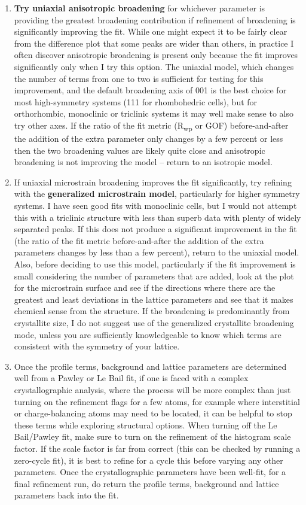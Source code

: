 \begin{enumerate}
 \item \textbf{Try uniaxial anisotropic broadening} for whichever parameter is providing the greatest broadening contribution if refinement of broadening is significantly improving the fit. While one might expect it to be fairly clear from the difference plot that some peaks are wider than others, in practice I often discover anisotropic broadening is present only because the fit improves significantly only when I try this option. The uniaxial model, which changes the number of terms from one to two is sufficient for testing for this improvement, and the default broadening axis of 001 is the best choice for most high-symmetry systems (111 for rhombohedric cells), but for orthorhombic, monoclinic or triclinic systems it may well make sense to also try other axes. If the ratio of the fit metric (R\textsubscript{wp} or GOF) before-and-after the addition of the extra parameter only changes by a few percent or less then the two broadening values are likely quite close and anisotropic broadening is not improving the model – return to an isotropic model. 

 \item If uniaxial microstrain broadening improves the fit significantly, try refining with the \textbf{generalized microstrain model}, particularly for higher symmetry systems. I have seen good fits with monoclinic cells, but I would not attempt this with a triclinic structure with less than superb data with plenty of widely separated peaks. If this does not produce a significant improvement in the fit (the ratio of the fit metric before-and-after the addition of the extra parameters changes by less than a few percent), return to the uniaxial model. Also, before deciding to use this model, particularly if the fit improvement is small considering the number of parameters that are added, look at the plot for the microstrain surface and see if the directions where there are the greatest and least deviations in the lattice parameters and see that it makes chemical sense from the structure. If the broadening is predominantly from crystallite size, I do not suggest use of the generalized crystallite broadening mode, unless you are sufficiently knowledgeable to know which terms are consistent with the symmetry of your lattice. 

 \item Once the profile terms, background and lattice parameters are determined well from a Pawley or Le Bail fit, if one is faced with a complex crystallographic analysis, where the process will be more complex than just turning on the refinement flags for a few atoms, for example where interstitial or charge-balancing atoms may need to be located, it can be helpful to stop these terms while exploring structural options. When turning off the Le Bail/Pawley fit, make sure to turn on the refinement of the histogram scale factor. If the scale factor is far from correct (this can be checked by running a zero-cycle fit), it is best to refine for a cycle this before varying any other parameters. Once the crystallographic parameters have been well-fit, for a final refinement run, do return the profile terms, background and lattice parameters back into the fit. 


\end{enumerate}
